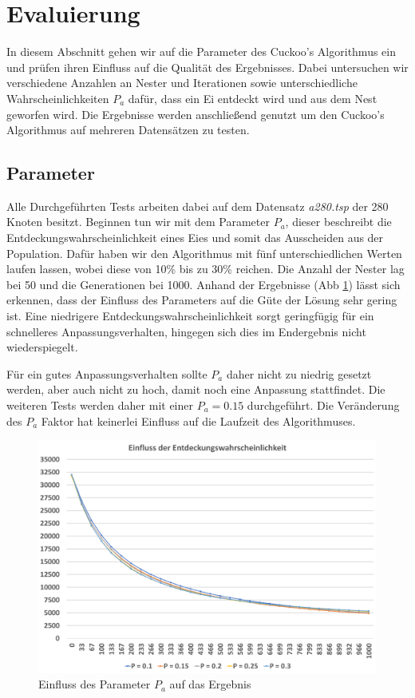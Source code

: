 \documentclass[conference]{IEEEtran}
\begin{document}
  \section{Evaluierung}
    In diesem Abschnitt gehen wir auf die Parameter des Cuckoo's Algorithmus ein und prüfen ihren Einfluss auf die Qualität des Ergebnisses.
    Dabei untersuchen wir verschiedene Anzahlen an Nester und Iterationen sowie unterschiedliche Wahrscheinlichkeiten $P_a$ dafür, dass ein Ei entdeckt wird 
    und aus dem Nest geworfen wird. Die Ergebnisse werden anschließend genutzt um den Cuckoo's Algorithmus auf mehreren 
    Datensätzen zu testen.


    \subsection{Parameter}
      Alle Durchgeführten Tests arbeiten dabei auf dem Datensatz \emph{a280.tsp} der 280 Knoten besitzt. 
      Beginnen tun wir mit dem Parameter $P_a$, dieser beschreibt die Entdeckungswahrscheinlichkeit eines Eies und somit das Ausscheiden aus der Population. 
      Dafür haben wir den Algorithmus mit fünf unterschiedlichen Werten laufen lassen, wobei diese von 10\% bis zu 30\% reichen. 
      Die Anzahl der Nester lag bei 50 und die Generationen bei 1000. 
      Anhand der Ergebnisse (Abb \ref{fig:pa}) lässt sich erkennen, dass der Einfluss des Parameters auf die Güte der Lösung sehr gering ist. Eine 
      niedrigere Entdeckungswahrscheinlichkeit sorgt geringfügig für ein schnelleres Anpassungsverhalten, hingegen sich dies im Endergebnis nicht wiederspiegelt. 
      
     

      Für ein gutes Anpassungsverhalten sollte $P_a$ daher nicht zu niedrig gesetzt werden, aber auch nicht zu hoch, damit noch eine Anpassung stattfindet. 
      Die weiteren Tests werden daher mit einer $P_a = 0.15$ durchgeführt.
      Die Veränderung des $P_a$ Faktor hat keinerlei Einfluss auf die Laufzeit des Algorithmuses.

      \begin{figure}[h]
        \centering
        \includegraphics[width=1\linewidth]{Entdeckungswahrscheinlichkeit.png}
        \caption{Einfluss des Parameter $P_a$ auf das Ergebnis}
        \label{fig:pa}
      \end{figure}
      
\end{document}
